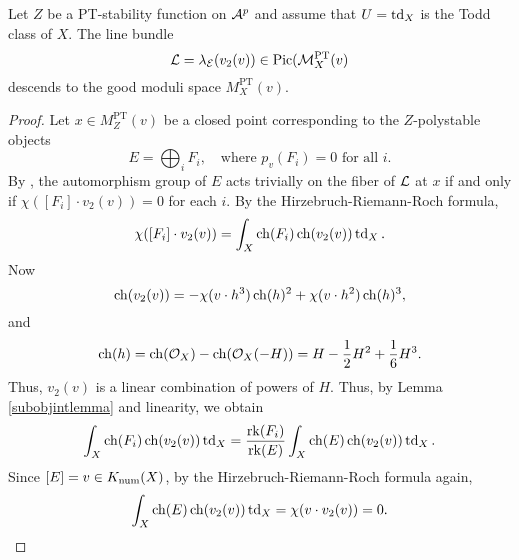 \begin{prop}\label{L2descendstogms}
Let $Z$ be a PT-stability function on $\mathcal{A}^p$ and assume that $U = \operatorname{\mathrm{td}}_X$ is the Todd class of $X$. The line bundle 
\[ \mathcal{L} = \lambda_{\mathcal{E}}(v_2(v)) \in \mathrm{Pic}(\mathcal{M}^{\text{PT}}_X(v) \]
descends to the good moduli space $M^{\text{PT}}_X(v)$.
\end{prop}
\begin{proof}
Let $x \in M^{\text{PT}}_Z(v)$ be a closed point corresponding to the $Z$-polystable objects
\[ E = \bigoplus_i F_i, \quad \text{where } p_v(F_i) = 0 \text{ for all } i. \]
By \cite[Proposition 4.2]{t}, the automorphism group of $E$ acts trivially on the fiber of $\mathcal{L}$ at $x$ if and only if $\chi([F_i]\cdot v_2(v)) = 0$ for each $i$. By the Hirzebruch-Riemann-Roch formula,
\[ \chi([F_i]\cdot v_2(v)) = \int_X \operatorname{\mathrm{ch}}(F_i) \operatorname{\mathrm{ch}}(v_2(v)) \operatorname{\mathrm{td}}_X. \]
Now
\[ \operatorname{\mathrm{ch}}(v_2(v)) =  -\chi(v \cdot h^3) \operatorname{\mathrm{ch}}(h)^2 + \chi(v \cdot h^2) \operatorname{\mathrm{ch}}(h)^3, \]
and
\[ \operatorname{\mathrm{ch}}(h) = \operatorname{\mathrm{ch}}(\mathcal{O}_X) - \operatorname{\mathrm{ch}}(\mathcal{O}_X(-H)) = H - \frac{1}{2} H^2 + \frac{1}{6} H^3. \]
Thus, $v_2(v)$ is a linear combination of powers of $H$. Thus, by Lemma \ref{subobjintlemma} and linearity, we obtain
\[ \int_X \operatorname{\mathrm{ch}}(F_i) \operatorname{\mathrm{ch}}(v_2(v)) \operatorname{\mathrm{td}}_X = \frac{\operatorname{\mathrm{rk}}(F_i)}{\operatorname{\mathrm{rk}}(E)} \int_X \operatorname{\mathrm{ch}}(E) \operatorname{\mathrm{ch}}(v_2(v)) \operatorname{\mathrm{td}}_X. \]
Since $[E] = v \in K_{\mathrm{num}}(X)$, by the Hirzebruch-Riemann-Roch formula again,
\[ \int_X \operatorname{\mathrm{ch}}(E) \operatorname{\mathrm{ch}}(v_2(v)) \operatorname{\mathrm{td}}_X = \chi(v \cdot v_2(v)) = 0. \] 
\end{proof}

